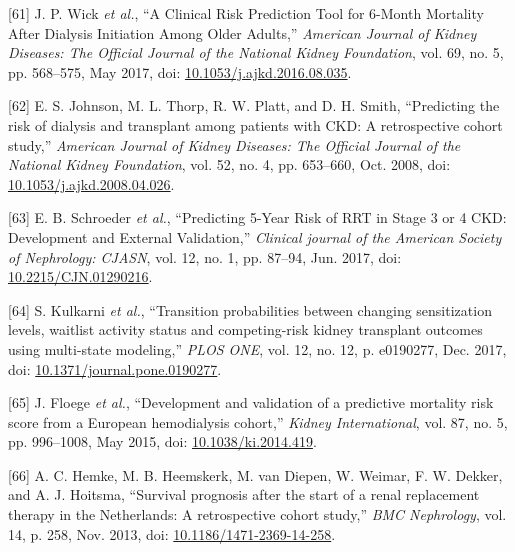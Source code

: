 \documentclass[12pt,PhD,twoside,openright]{muthesis}
\newenvironment{cslreferences}%
  {}%
  {\par}
\begin{document}
\begin{cslreferences}
\leavevmode\hypertarget{ref-wick_clinical_2017}{}%
{[}61{]} J. P. Wick \emph{et al.}, ``A Clinical Risk Prediction Tool for 6-Month Mortality After Dialysis Initiation Among Older Adults,'' \emph{American Journal of Kidney Diseases: The Official Journal of the National Kidney Foundation}, vol. 69, no. 5, pp. 568--575, May 2017, doi: \href{https://doi.org/10.1053/j.ajkd.2016.08.035}{10.1053/j.ajkd.2016.08.035}.

\leavevmode\hypertarget{ref-johnson_predicting_2008}{}%
{[}62{]} E. S. Johnson, M. L. Thorp, R. W. Platt, and D. H. Smith, ``Predicting the risk of dialysis and transplant among patients with CKD: A retrospective cohort study,'' \emph{American Journal of Kidney Diseases: The Official Journal of the National Kidney Foundation}, vol. 52, no. 4, pp. 653--660, Oct. 2008, doi: \href{https://doi.org/10.1053/j.ajkd.2008.04.026}{10.1053/j.ajkd.2008.04.026}.

\leavevmode\hypertarget{ref-schroeder_predicting_2017}{}%
{[}63{]} E. B. Schroeder \emph{et al.}, ``Predicting 5-Year Risk of RRT in Stage 3 or 4 CKD: Development and External Validation,'' \emph{Clinical journal of the American Society of Nephrology: CJASN}, vol. 12, no. 1, pp. 87--94, Jun. 2017, doi: \href{https://doi.org/10.2215/CJN.01290216}{10.2215/CJN.01290216}.

\leavevmode\hypertarget{ref-kulkarni_transition_2017}{}%
{[}64{]} S. Kulkarni \emph{et al.}, ``Transition probabilities between changing sensitization levels, waitlist activity status and competing-risk kidney transplant outcomes using multi-state modeling,'' \emph{PLOS ONE}, vol. 12, no. 12, p. e0190277, Dec. 2017, doi: \href{https://doi.org/10.1371/journal.pone.0190277}{10.1371/journal.pone.0190277}.

\leavevmode\hypertarget{ref-floege_development_2015}{}%
{[}65{]} J. Floege \emph{et al.}, ``Development and validation of a predictive mortality risk score from a European hemodialysis cohort,'' \emph{Kidney International}, vol. 87, no. 5, pp. 996--1008, May 2015, doi: \href{https://doi.org/10.1038/ki.2014.419}{10.1038/ki.2014.419}.

\leavevmode\hypertarget{ref-hemke_survival_2013}{}%
{[}66{]} A. C. Hemke, M. B. Heemskerk, M. van Diepen, W. Weimar, F. W. Dekker, and A. J. Hoitsma, ``Survival prognosis after the start of a renal replacement therapy in the Netherlands: A retrospective cohort study,'' \emph{BMC Nephrology}, vol. 14, p. 258, Nov. 2013, doi: \href{https://doi.org/10.1186/1471-2369-14-258}{10.1186/1471-2369-14-258}.


\end{cslreferences}
\end{document}
